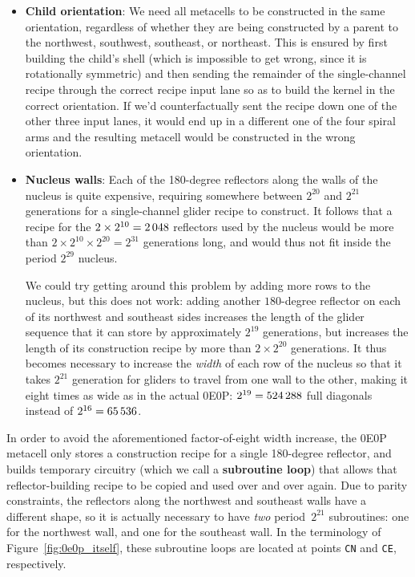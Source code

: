 \begin{itemize}
	\item \textbf{Child orientation}: We need all metacells to be constructed in the same orientation, regardless of whether they are being constructed by a parent to the northwest, southwest, southeast, or northeast. This is ensured by first building the child's shell (which is impossible to get wrong, since it is rotationally symmetric) and then sending the remainder of the single-channel recipe through the correct recipe input lane so as to build the kernel in the correct orientation. If we'd counterfactually sent the recipe down one of the other three input lanes, it would end up in a different one of the four spiral arms and the resulting metacell would be constructed in the wrong orientation.\smallskip
	
	\item \textbf{Nucleus walls}: Each of the 180-degree reflectors along the walls of the nucleus is quite expensive, requiring somewhere between $2^{20}$ and $2^{21}$ generations for a single-channel glider recipe to construct. It follows that a recipe for the $2 \times 2^{10} = 2{\,}048$ reflectors used by the nucleus would be more than $2 \times 2^{10} \times 2^{20} = 2^{31}$ generations long, and would thus not fit inside the period $2^{29}$ nucleus.
	
	We could try getting around this problem by adding more rows to the nucleus, but this does not work: adding another $180$-degree reflector on each of its northwest and southeast sides increases the length of the glider sequence that it can store by approximately $2^{19}$ generations, but increases the length of its construction recipe by more than $2 \times 2^{20}$ generations. It thus becomes necessary to increase the \emph{width} of each row of the nucleus so that it takes $2^{21}$ generation for gliders to travel from one wall to the other, making it eight times as wide as in the actual 0E0P: $2^{19} = 524{\,}288$ full diagonals instead of $2^{16} = 65{\,}536$.\smallskip
\end{itemize}

In order to avoid the aforementioned factor-of-eight width increase, the 0E0P metacell only stores a construction recipe for a single 180-degree reflector, and builds temporary circuitry (which we call a \textbf{subroutine loop}) that allows that reflector-building recipe to be copied and used over and over again. Due to parity constraints, the reflectors along the northwest and southeast walls have a different shape, so it is actually necessary to have \emph{two} period~$2^{21}$ subroutines: one for the northwest wall, and one for the southeast wall. In the terminology of Figure~\ref{fig:0e0p_itself}, these subroutine loops are located at points \texttt{CN} and \texttt{CE}, respectively.

